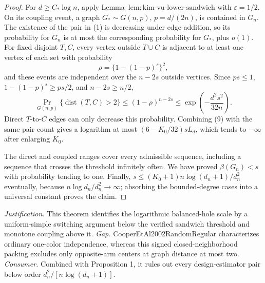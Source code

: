 \documentclass{article}
\begin{document}
\begin{proof}
For \(d\ge C_*\log n\), apply Lemma~\(\mathrm{lem{:}kim\mbox{-}vu\mbox{-}lower\mbox{-}sandwich}\) with \(\varepsilon=1/2\).  On its coupling event, a graph \(G_*\sim G(n,p)\), \(p=d/(2n)\), is contained in \(G_n\).  The existence of the pair in (1) is decreasing under edge addition, so its probability for \(G_n\) is at most the corresponding probability for \(G_*\), plus \(o(1)\).  For fixed disjoint \(T,C\), every vertex outside \(T\cup C\) is adjacent to at least one vertex of each set with probability
\[
\rho=\{1-(1-p)^s\}^2,
\]
and these events are independent over the \(n-2s\) outside vertices.  Since \(ps\le1\), \(1-(1-p)^s\ge ps/2\), and \(n-2s\ge n/2\),
\[
\Pr_{G(n,p)}\{\operatorname{dist}(T,C)>2\}
\le(1-\rho)^{n-2s}
\le\exp\!\left(-\frac{d^2s^2}{32n}\right).
\tag{9}
\]
Direct \(T\)-to-\(C\) edges can only decrease this probability.  Combining (9) with the same pair count gives a logarithm at most \((6-K_0/32)sL_d\), which tends to \(-\infty\) after enlarging \(K_0\).

The direct and coupled ranges cover every admissible sequence, including a sequence that crosses the threshold infinitely often.  We have proved \(\beta(G_n)<s\) with probability tending to one.  Finally, \(s\le (K_0+1)n\log(d_n+1)/d_n^2\) eventually, because \(n\log d_n/d_n^2\to\infty\); absorbing the bounded-degree cases into a universal constant proves the claim.
\end{proof}
\par\smallskip\noindent \textit{Justification.} This theorem identifies the logarithmic balanced-hole scale by a uniform-simple switching argument below the verified sandwich threshold and monotone coupling above it. \textit{Gap.} CooperEtAl2002RandomRegular characterizes ordinary one-color independence, whereas this signed closed-neighborhood packing excludes only opposite-arm centers at graph distance at most two. \textit{Consumer.} Combined with Proposition 1, it rules out every design-estimator pair below order \(d_n^2/[n\log(d_n+1)]\).
\end{document}
